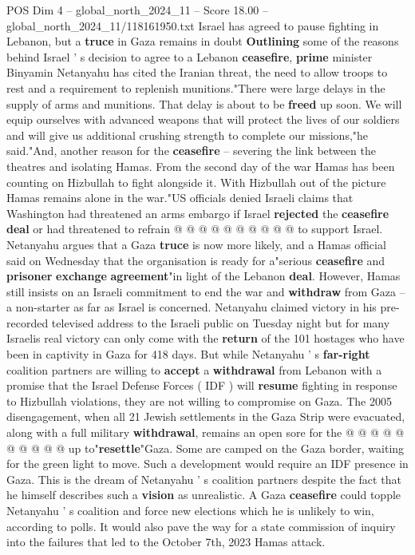 \begin{textsample}{POS Dim 4 – global\_north\_2024\_11 – Score 18.00 – global\_north\_2024\_11/118161950.txt}  \label{ex:f4_pos_290}
Israel has agreed to pause fighting in Lebanon, but a \textbf{truce} in Gaza remains in doubt \textbf{Outlining} some of the reasons behind Israel ' s decision to agree to a Lebanon \textbf{ceasefire}, \textbf{prime} minister Binyamin Netanyahu has cited the Iranian threat, the need to allow troops to rest and a requirement to replenish munitions."There were large delays in the supply of arms and munitions.
That delay is about to be \textbf{freed} up soon.
We will equip ourselves with advanced weapons that will protect the lives of our soldiers and will give us additional crushing strength to complete our missions,"he said."And, another reason for the \textbf{ceasefire} -- severing the link between the theatres and isolating Hamas.
From the second day of the war Hamas has been counting on Hizbullah to fight alongside it.
With Hizbullah out of the picture Hamas remains alone in the war."US officials denied Israeli claims that Washington had threatened an arms embargo if Israel \textbf{rejected} the \textbf{ceasefire} \textbf{deal} or had threatened to refrain @ @ @ @ @ @ @ @ @ @ to support Israel.
Netanyahu argues that a Gaza \textbf{truce} is now more likely, and a Hamas official said on Wednesday that the organisation is ready for a"serious \textbf{ceasefire} and \textbf{prisoner} \textbf{exchange} \textbf{agreement}"in light of the Lebanon \textbf{deal}.
However, Hamas still insists on an Israeli commitment to end the war and \textbf{withdraw} from Gaza -- a non-starter as far as Israel is concerned.
Netanyahu claimed victory in his pre-recorded televised address to the Israeli public on Tuesday night but for many Israelis real victory can only come with the \textbf{return} of the 101 hostages who have been in captivity in Gaza for 418 days.
But while Netanyahu ' s \textbf{far-right} coalition partners are willing to \textbf{accept} a \textbf{withdrawal} from Lebanon with a promise that the Israel Defense Forces ( IDF ) will \textbf{resume} fighting in response to Hizbullah violations, they are not willing to compromise on Gaza.
The 2005 disengagement, when all 21 Jewish settlements in the Gaza Strip were evacuated, along with a full military \textbf{withdrawal}, remains an open sore for the @ @ @ @ @ @ @ @ @ @ up to"\textbf{resettle}"Gaza.
Some are camped on the Gaza border, waiting for the green light to move.
Such a development would require an IDF presence in Gaza.
This is the dream of Netanyahu ' s coalition partners despite the fact that he himself describes such a \textbf{vision} as unrealistic.
A Gaza \textbf{ceasefire} could topple Netanyahu ' s coalition and force new elections which he is unlikely to win, according to polls.
It would also pave the way for a state commission of inquiry into the failures that led to the October 7th, 2023 Hamas attack.

\end{textsample}
